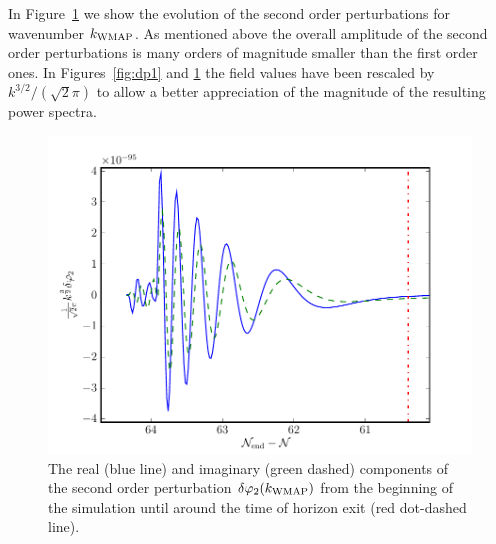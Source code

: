 In Figure~\ref{fig:dp2realimag} we show the evolution of the second
order perturbations for wavenumber $k_\mathrm{WMAP}$. As mentioned above the
overall amplitude of the second order perturbations is many orders of
magnitude smaller than the first order ones. In Figures~\ref{fig:dp1}
and \ref{fig:dp2realimag} the field values have been rescaled by
$k^{3/2}/(\sqrt{2}\pi)$ to allow a better appreciation of the
magnitude of the resulting power spectra.
% 
\begin{figure}
 \centering
 \includegraphics[scale=0.8]{numerical/graphs/dp2_kwmap}
 \caption{The real (blue line) and imaginary (green dashed) components of the second order
perturbation $\delta\varphi_{2}(k_\mathrm{WMAP})$ from the beginning of the simulation until around the time
of horizon exit (red dot-dashed line).}
\label{fig:dp2realimag}
\end{figure}
% 



